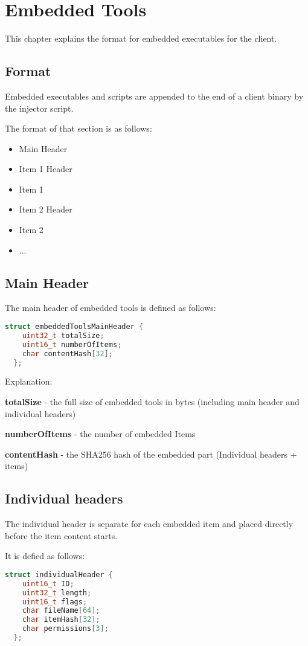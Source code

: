 \chapter{Embedded Tools}
\label{chapt-embeddedTools}
This chapter explains the format for embedded executables for the client.

\section{Format}
Embedded executables and scripts are appended to the end of a client binary by the injector script.

The format of that section is as follows:
\begin{itemize}
  \item Main Header
  \item Item 1 Header
  \item Item 1
  \item Item 2 Header
  \item Item 2
  \item ...
\end{itemize}
\section{Main Header}
The main header of embedded tools is defined as follows:
\begin{lstlisting}[language=C++]
  struct embeddedToolsMainHeader {
    uint32_t totalSize;
    uint16_t numberOfItems;
    char contentHash[32];
  };
\end{lstlisting}

Explanation:

\textbf{totalSize} - the full size of embedded tools in bytes (including main header and individual headers)

\textbf{numberOfItems} - the number of embedded Items

\textbf{contentHash} - the SHA256 hash of the embedded part (Individual headers + items)

\section{Individual headers}

The individual header is separate for each embedded item and placed directly before the item content starts.

It is defied as follows:
\begin{lstlisting}[language=C++]
  struct individualHeader {
    uint16_t ID;
    uint32_t length;
    uint16_t flags;
    char fileName[64];
    char itemHash[32];
    char permissions[3];
  };
\end{lstlisting}

